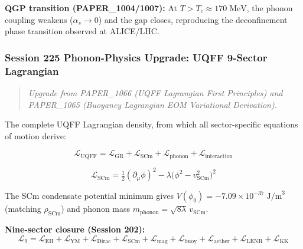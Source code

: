 \documentclass[
  11pt,
]{article}
\begin{document}
\textbf{QGP transition (PAPER\_1004/1007):} At
$T > T_c \approx 170\;\text{MeV}$, the phonon coupling weakens
($\alpha_s \to 0$) and the gap closes, reproducing the deconfinement
phase transition observed at ALICE/LHC.

\subsubsection{Session 225 Phonon-Physics Upgrade: UQFF 9-Sector
Lagrangian}\label{session-225-phonon-physics-upgrade-uqff-9-sector-lagrangian}

\begin{quote}
\emph{Upgrade from PAPER\_1066 (UQFF Lagrangian First Principles) and
PAPER\_1065 (Buoyancy Lagrangian EOM Variational Derivation).}
\end{quote}

The complete UQFF Lagrangian density, from which all sector-specific
equations of motion derive:

\[\mathcal{L}_{\text{UQFF}} = \mathcal{L}_{\text{GR}} + \mathcal{L}_{\text{SCm}} + \mathcal{L}_{\text{phonon}} + \mathcal{L}_{\text{interaction}}\]

\[\mathcal{L}_{\text{SCm}} = \tfrac{1}{2}(\partial_\mu \phi)^2 - \lambda\bigl(\phi^2 - v_{\text{SCm}}^2\bigr)^2\]

The SCm condensate potential minimum gives
$V(\phi_0) = -7.09 \times 10^{-37}\;\text{J/m}^3$ (matching
$\rho_{\text{SCm}}$) and phonon mass
$m_{\text{phonon}} = \sqrt{8\lambda}\,v_{\text{SCm}}$.

\textbf{Nine-sector closure (Session 202):}
\[\mathcal{L}_{9} = \mathcal{L}_{\text{EH}} + \mathcal{L}_{\text{YM}} + \mathcal{L}_{\text{Dirac}} + \mathcal{L}_{\text{SCm}} + \mathcal{L}_{\text{mag}} + \mathcal{L}_{\text{buoy}} + \mathcal{L}_{\text{aether}} + \mathcal{L}_{\text{LENR}} + \mathcal{L}_{\text{KK}}\]
\end{document}
